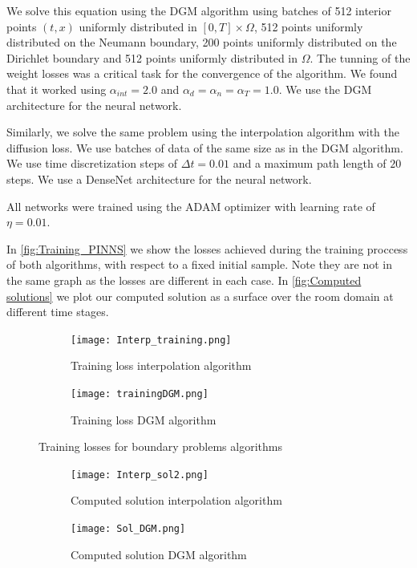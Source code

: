 We solve this equation using the DGM algorithm using batches of 512 interior points $(t,x)$ uniformly distributed  in $[0,T]\times \Omega$, 512 points uniformly distributed  on the Neumann boundary, 200 points uniformly distributed on the Dirichlet boundary and 512 points uniformly distributed in $\Omega$. The tunning of the weight losses was a critical task for the convergence of the algorithm. We found that it worked using $\alpha_{int}=2.0$ and $\alpha_d=\alpha_n=\alpha_T=1.0$. We use the DGM architecture for the neural network.

Similarly, we solve the same problem using the interpolation algorithm with the diffusion loss. We use batches of data of the same size as in the DGM algorithm. We use time discretization steps of $\Delta t=0.01$ and a maximum path length of $20$ steps. We use a DenseNet architecture for the neural network.

All networks were trained using the ADAM optimizer with learning rate of $\eta=0.01$.

In \autoref{fig:Training_PINNS} we show the losses achieved during the training proccess of both algorithms, with respect to a fixed initial sample. Note they are not in the same graph as the losses are different in each case. In \autoref{fig:Computed solutions} we plot our computed solution as a surface over the room domain at different time stages. 

\begin{figure}[htb!]		
	\begin{subfigure}{.475\linewidth}
		\texttt{[image: Interp\_training.png]}
		\caption{Training loss interpolation algorithm}
		\label{fig:Interpolation_loss}
	\end{subfigure}\hfill %
	\begin{subfigure}{.475\linewidth}
		\texttt{[image: trainingDGM.png]}
		\caption{Training loss DGM algorithm}
		\label{fig:DGM_algorithm}
	\end{subfigure}
	\caption{Training losses for boundary problems algorithms}
	\label{fig:Training_PINNS}
\end{figure}

\begin{figure}[H]		
	\begin{subfigure}{\linewidth}
		\texttt{[image: Interp\_sol2.png]}
		\caption{Computed solution interpolation algorithm}
		\label{fig:Solution_Interp}
	\end{subfigure}
\medskip
	\begin{subfigure}{\linewidth}
		\texttt{[image: Sol\_DGM.png]}
		\caption{Computed solution DGM algorithm}
		\label{fig:Solution_DGM}
	\end{subfigure}
	\caption{}
	\label{fig:Computed solutions}
\end{figure}

